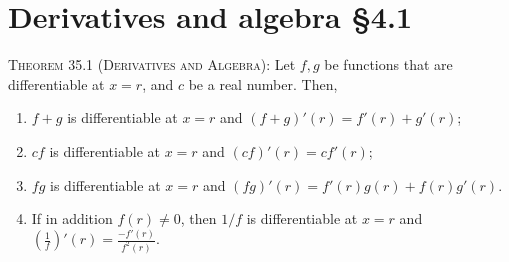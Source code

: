 \documentclass[12pt]{amsart}
\begin{document}
	
	
	\thispagestyle{empty}
	
	
	\section*{Derivatives and algebra \S4.1}
	
\begin{framed} 


 \noindent \textsc{Theorem 35.1 (Derivatives and Algebra):}   Let $f,g$ be functions that are differentiable at $x=r$, and $c$ be a real number. Then,
 \begin{enumerate}
 \item $f+g$ is differentiable at $x=r$ and $(f+g)'(r) = f'(r) + g'(r)$;
 \item $cf$ is differentiable at $x=r$ and $(cf)'(r) = c f'(r)$;
 \item $fg$ is differentiable at $x=r$ and $(fg)'(r) = f'(r) g(r) + f(r) g'(r)$.
 \item If in addition $f(r)\neq 0$, then $1/f$ is differentiable at $x=r$ and $\displaystyle \left(\frac{1}{f}\right)'\!\!(r)= \frac{-f'(r)}{f^2(r)}$.
    \end{enumerate}
 \end{framed}


\
\end{document}
